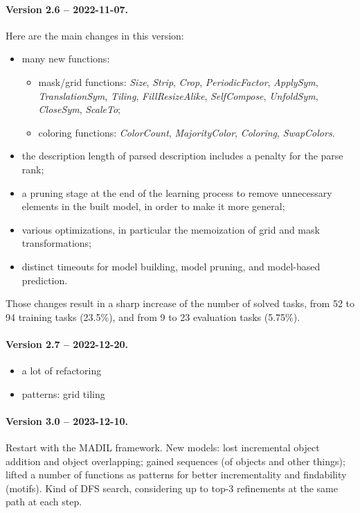 \documentclass[a4paper]{llncs}
\begin{document}
\paragraph{Version 2.6 -- 2022-11-07.} Here are the main changes in this version:
\begin{itemize}
\item many new functions:
  \begin{itemize}
  \item mask/grid functions: {\it Size}, {\it Strip}, {\it Crop}, {\it PeriodicFactor}, {\it ApplySym}, {\it TranslationSym}, {\it Tiling}, {\it FillResizeAlike}, {\it SelfCompose}, {\it UnfoldSym}, {\it CloseSym}, {\it ScaleTo};
  \item coloring functions: {\it ColorCount}, {\it MajorityColor}, {\it Coloring}, {\it SwapColors}.
  \end{itemize}
\item the description length of parsed description includes a penalty for the parse rank;
\item a pruning stage at the end of the learning process to remove unnecessary elements in the built model, in order to make it more general;
\item various optimizations, in particular the memoization of grid and mask transformations;
\item distinct timeouts for model building, model pruning, and model-based prediction.
\end{itemize}
Those changes result in a sharp increase of the number of solved
tasks, from 52 to 94 training tasks (23.5\%), and from 9 to 23 evaluation tasks (5.75\%).

\paragraph{Version 2.7 -- 2022-12-20.}
\begin{itemize}
\item a lot of refactoring
\item patterns: grid tiling
\end{itemize}

\paragraph{Version 3.0 -- 2023-12-10.} Restart with the MADIL framework. New models:
lost incremental object addition and object overlapping; gained
sequences (of objects and other things); lifted a number of functions
as patterns for better incrementality and findability (motifs). Kind
of DFS search, considering up to top-3 refinements at the same path at
each step.
\end{document}
